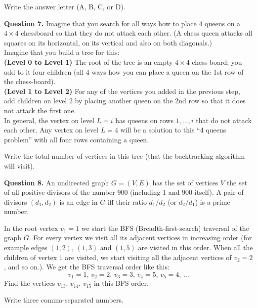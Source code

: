 \documentclass[jou]{apa6}
\begin{document}
Write the answer letter (A, B, C, or D).



\vspace{10pt}
{\bf Question 7.} 
Imagine that you search for all ways how to place $4$ queens on a $4 \times 4$ chessboard so that 
they do not attack each other. (A chess queen attacks all squares on its horizontal, on its vertical
and also on both diagonals.)\\
Imagine that you build a tree for this:\\
{\bf (Level 0 to Level 1)} The root of the tree is an empty $4 \times 4$ chess-board; you add to it four children 
(all $4$ ways how you can place a queen on the 1st row of the chess-board).\\
{\bf (Level 1 to Level 2)} For any of the vertices you added in the previous step, add children on level $2$ by placing 
another queen on the 2nd row so that it does not attack the first one.\\
In general, the vertex on level $L=i$ has queens on rows $1,\ldots,i$ that do not attack each other. 
Any vertex on level $L=4$ will be a solution to this ``4 queens problem'' with all four rows containing a queen.

Write the total number of vertices in this tree (that the backtracking algorithm will visit).


\vspace{10pt}
{\bf Question 8.} An undirected graph $G = (V,E)$ has the set of vertices $V$ \textendash{} 
the set of all positive divisors of the number $900$ (including $1$ and $900$ itself).
A pair of divisors $(d_1,d_2)$ is an edge in $G$ iff their ratio
$d_1/d_2$ (or $d_2/d_1$) is a prime number.

In the root vertex $v_1=1$ we start the BFS (Breadth-first-search) traversal of the graph $G$. For every vertex 
we visit all its adjacent vertices in increasing order (for example edges $(1,2)$, $(1,3)$ and $(1,5)$ 
are visited in this order. When all the children of vertex $1$ are visited, 
we start visiting all the adjacent vertices of $v_2=2$, and so on.). We get the BFS traversal order like this:
$$v_1=1,\,v_2=2,\,v_3=3,\,v_4=5,\,v_5=4,\,\ldots$$
Find the vertices $v_{13},\,v_{14},\,v_{15}$ in this BFS order.

Write three comma-separated numbers.
\end{document}
